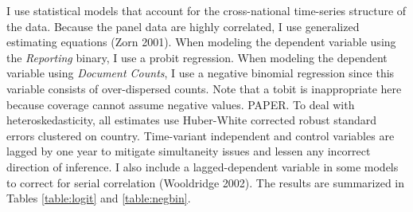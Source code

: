 \documentclass[11pt, oneside]{article}
\begin{document}
I use statistical models that account for the cross-national time-series structure of the data. Because the panel data are highly correlated, I use generalized estimating equations (Zorn 2001). When modeling the dependent variable using the \emph{Reporting} binary, I use a probit regression. When modeling the dependent variable using \emph{Document Counts}, I use a negative binomial regression since this variable consists of over-dispersed counts. Note that a tobit is inappropriate here because coverage cannot assume negative values. PAPER. To deal with heteroskedasticity, all estimates use Huber-White corrected robust standard errors clustered on country.  Time-variant independent and control variables are lagged by one year to mitigate simultaneity issues and lessen any incorrect direction of inference. I also include a lagged-dependent variable in some models to correct for serial correlation (Wooldridge 2002). The results are summarized in Tables \ref{table:logit} and \ref{table:negbin}.
\end{document}
